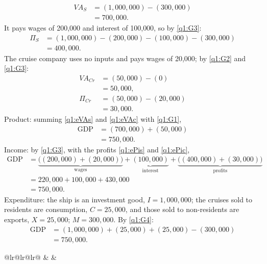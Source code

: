 \begin{sol}
\begin{align}
VA_S &= (1{,}000{,}000)-(300{,}000) \nonumber\\
&= 700{,}000. \label{q1:eVAs}
\end{align}
It pays wages of 200{,}000 and interest of 100{,}000, so by \eqref{q1:G3}:
\begin{align}
\Pi_S &= (1{,}000{,}000)-(200{,}000)-(100{,}000)-(300{,}000) \nonumber\\
&= 400{,}000. \label{q1:ePis}
\end{align}
The cruise company uses no inputs and pays wages of 20{,}000; by \eqref{q1:G2} and \eqref{q1:G3}:
\begin{align}
VA_{Cr} &= (50{,}000)-(0) \nonumber\\
&= 50{,}000, \label{q1:eVAc}\\
\Pi_{Cr} &= (50{,}000)-(20{,}000) \nonumber\\
&= 30{,}000. \label{q1:ePic}
\end{align}
Product: summing \eqref{q1:eVAs} and \eqref{q1:eVAc} with \eqref{q1:G1},
\begin{align*}
\text{GDP} &= (700{,}000)+(50{,}000)\\
&= 750{,}000 .
\end{align*}
Income: by \eqref{q1:G3}, with the profits \eqref{q1:ePis} and \eqref{q1:ePic},
\begin{align*}
\text{GDP} &= \underbrace{\big((200{,}000)+(20{,}000)\big)}_{\text{wages}}+\underbrace{(100{,}000)}_{\text{interest}}
+\underbrace{\big((400{,}000)+(30{,}000)\big)}_{\text{profits}}\\
&= 220{,}000+100{,}000+430{,}000\\
&= 750{,}000 .
\end{align*}
Expenditure: the ship is an investment good, $I=1{,}000{,}000$; the cruises sold to residents are consumption, $C=25{,}000$, and
those sold to non-residents are exports, $X=25{,}000$; $M=300{,}000$. By \eqref{q1:G4}:
\begin{align*}
\text{GDP} &= (1{,}000{,}000)+(25{,}000)+(25{,}000)-(300{,}000)\\
&= 750{,}000 .
\end{align*}
\begin{center}\footnotesize\begin{tabular}{@{}lr@{\qquad}lr@{\qquad}lr@{}}\toprule
{} &  & \\\midrule

\end{tabular}
\end{center}
\end{sol}
